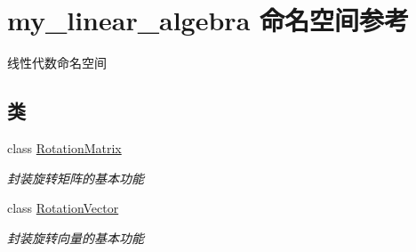 \hypertarget{namespacemy__linear__algebra}{}\section{my\+\_\+linear\+\_\+algebra 命名空间参考}
\label{namespacemy__linear__algebra}


线性代数命名空间  


\subsection*{类}
\begin{DoxyCompactItemize}
\item 
class \mbox{\hyperlink{classmy__linear__algebra_1_1_rotation_matrix}{Rotation\+Matrix}}
\begin{DoxyCompactList}\small\item\em 封装旋转矩阵的基本功能 \end{DoxyCompactList}\item 
class \mbox{\hyperlink{classmy__linear__algebra_1_1_rotation_vector}{Rotation\+Vector}}
\begin{DoxyCompactList}\small\item\em 封装旋转向量的基本功能 \end{DoxyCompactList}\end{DoxyCompactItemize}
